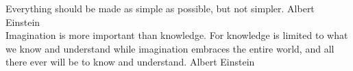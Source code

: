 \thispagestyle{empty}
    \null{}
        \begin{flushright}
                Everything should be made as simple as possible, but
                not simpler. Albert Einstein \\
                Imagination is more important than knowledge. For
                knowledge is limited to what we know and understand
                while imagination embraces the entire world, and all
                there ever will be to know and understand. Albert
                Einstein \\
                
        \end{flushright}
        \null

        
